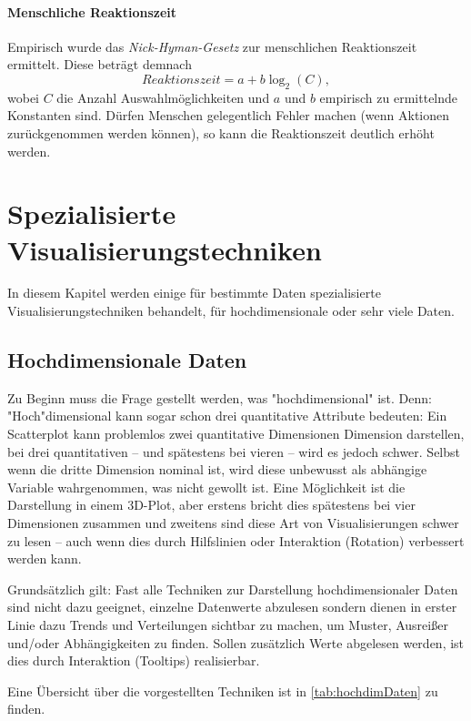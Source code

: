 			\subsubsection{Menschliche Reaktionszeit}
				Empirisch wurde das \emph{Nick-Hyman-Gesetz} zur menschlichen Reaktionszeit ermittelt. Diese beträgt demnach
				\begin{equation}
					\mathit{Reaktionszeit} = a + b \log_2(C),
				\end{equation}
				wobei \(C\) die Anzahl Auswahlmöglichkeiten und \(a\) und \(b\) empirisch zu ermittelnde Konstanten sind. Dürfen Menschen gelegentlich Fehler machen (\zB wenn Aktionen zurückgenommen werden können), so kann die Reaktionszeit deutlich erhöht werden.

\chapter{Spezialisierte Visualisierungstechniken}
	In diesem Kapitel werden einige für bestimmte Daten spezialisierte Visualisierungstechniken behandelt, \bspw für hochdimensionale oder sehr viele Daten.

	\section{Hochdimensionale Daten}
		Zu Beginn muss die Frage gestellt werden, was "hochdimensional" ist. Denn: "Hoch"dimensional kann sogar schon drei quantitative Attribute bedeuten: Ein Scatterplot kann \bspw problemlos zwei quantitative Dimensionen Dimension darstellen, bei drei quantitativen -- und spätestens bei vieren -- wird es jedoch schwer. Selbst wenn die dritte Dimension nominal ist, wird diese unbewusst als abhängige Variable wahrgenommen, was \ggf nicht gewollt ist. Eine Möglichkeit ist die Darstellung in einem 3D-Plot, aber erstens bricht dies spätestens bei vier Dimensionen zusammen und zweitens sind diese Art von Visualisierungen schwer zu lesen -- auch wenn dies durch Hilfslinien oder Interaktion (\bspw Rotation) verbessert werden kann.

		Grundsätzlich gilt: Fast alle Techniken zur Darstellung hochdimensionaler Daten sind nicht dazu geeignet, einzelne Datenwerte abzulesen sondern dienen in erster Linie dazu Trends und Verteilungen sichtbar zu machen, um Muster, Ausreißer und/oder Abhängigkeiten zu finden. Sollen zusätzlich Werte abgelesen werden, ist dies durch Interaktion (\zB Tooltips) realisierbar.

		Eine Übersicht über die vorgestellten Techniken ist in \autoref{tab:hochdimDaten} zu finden.

